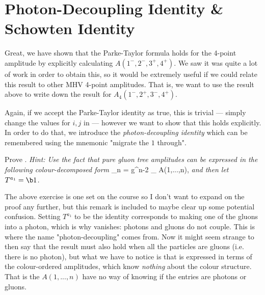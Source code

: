 \section{Photon-Decoupling Identity \& Schowten Identity}

Great, we have shown that the Parke-Taylor formula holds for the 4-point amplitude by explicitly calculating $A(1^-,2^-,3^+,4^+)$. We saw it was quite a lot of work in order to obtain this, so it would be extremely useful if we could relate this result to other MHV 4-point amplitudes. That is, we want to use the result above to write down the result for $A_4(1^-,2^+,3^-,4^+)$. 

Again, if we accept the Parke-Taylor identity as true, this is trivial --- simply change the values for $i,j$ in  --- however we want to show that this holds explicitly. In order to do that, we introduce the \textit{photon-decoupling identity}
\noindent which can be remembered using the mnemonic "migrate the $1$ through". 

\bbox 
    Prove . \textit{Hint: Use the fact that pure gluon tree amplitudes can be expressed in the following colour-decomposed form}
    \bse 
        \cA_n = g^{n-2} \sum_{} \Tr[T^{a_1} ... T^{a_n}] A(1,...,n),
    \ese 
    \textit{and then let $T^{a_1}=\b1$.}
\ebox 

\br 
    The above exercise is one set on the course so I don't want to expand on the proof any further, but this remark is included to maybe clear up some potential confusion. Setting $T^{a_1}$ to be the identity corresponds to making one of the gluons into a photon, which is why  vanishes: photons and gluons do not couple. This is where the name "photon-decoupling" comes from. Now it might seem strange to then say that the result must also hold when all the particles are gluons (i.e. there is no photon), but what we have to notice is that  is expressed in terms of the colour-ordered amplitudes, which know \textit{nothing} about the colour structure. That is the $A(1,...,n)$ have no way of knowing if the entries are photons or gluons. 
\er 

